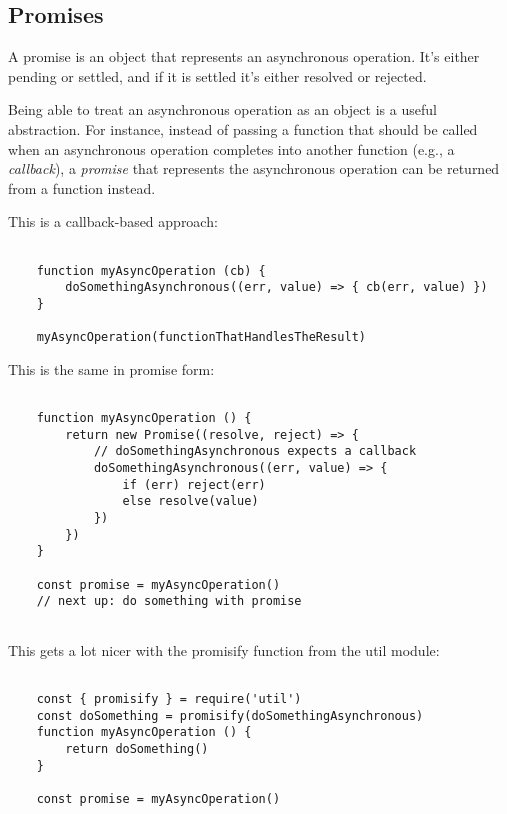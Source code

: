 \documentclass{scrartcl}
\begin{document}
\subsection{Promises}

A promise is an object that represents an asynchronous operation. It's either pending or settled, and if it is settled it's either resolved or rejected.

Being able to treat an asynchronous operation as an object is a useful abstraction. For instance, instead of passing a function that should be called when an asynchronous operation completes into another function (e.g., a \textit{callback}), a \textit{promise} that represents the asynchronous operation can be returned from a function instead.

This is a callback-based approach:

\begin{lstlisting}[style=ES6]

    function myAsyncOperation (cb) {
        doSomethingAsynchronous((err, value) => { cb(err, value) })
    }

    myAsyncOperation(functionThatHandlesTheResult)

\end{lstlisting}

This is the same in promise form:

\begin{lstlisting}[style=ES6]

    function myAsyncOperation () {
        return new Promise((resolve, reject) => {
            // doSomethingAsynchronous expects a callback
            doSomethingAsynchronous((err, value) => {
                if (err) reject(err)
                else resolve(value)
            })
        })
    }

    const promise = myAsyncOperation()
    // next up: do something with promise


\end{lstlisting}

This gets a lot nicer with the promisify function from the util module:

\begin{lstlisting}[style=ES6]

    const { promisify } = require('util')
    const doSomething = promisify(doSomethingAsynchronous)
    function myAsyncOperation () {
        return doSomething()
    }

    const promise = myAsyncOperation()

\end{lstlisting}
\end{document}
